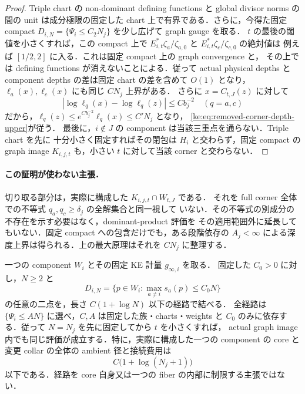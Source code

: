 \begin{proof}
Triple chart の non-dominant defining functions と global divisor norms の間の
unit は成分極限の固定した chart 上で有界である．さらに，今得た固定 compact
$D_{i,N}=\{\Psi_i\le C_2N_j\}$ を少し広げて graph gauge を取る．
$t$ の最後の閾値を小さくすれば，この compact 上で
$E_{i,t}^*\zeta_a/\zeta_{a,0}$ と $E_{i,t}^*\zeta_c/\zeta_{c,0}$ の絶対値は
例えば $[1/2,2]$ に入る．これは固定 compact 上の graph convergence と，
その上では defining functions が消えないことによる．従って actual physical depths と
component depths の差は固定 chart の差を含めて $O(1)$ となり，
$\ell_a(x),\ell_c(x)$ にも同じ $C N_j$ 上界がある．
さらに $x=C_{t,J}(z)$ に対して
\[
 |\log\ell_q(x)-\log\ell_q(z)|\le Cb_j^{-2}
 \quad(q=a,c)
\]
だから，$\ell_q(z)\le e^{Cb_j^{-2}}\ell_q(x)\le C'N_j$ となり，
\eqref{ke:eq:removed-corner-depth-upper}が従う．
最後に，$i\notin J$ の component は当該三重点を通らない．Triple chart を先に
十分小さく固定すればその閉包は $H_i$ と交わらず，固定 compact の graph image
$K_{i,j,t}$ も，小さい $t$ に対して当該 corner と交わらない．
\end{proof}

\paragraph{この証明が使わない主張．}
切り取る部分は，実際に構成した $K_{i,j,t}\cap W_{t,J}$ である．
それを full corner 全体での不等式 $q_a,q_c\ge\delta_j$ の全解集合と同一視して
いない．その不等式の別成分の不存在を示す必要はなく，dominant-product 評価を
その適用範囲外に延長してもいない．固定 compact への包含だけでも，ある段階依存の
$A_j<\infty$ による深度上界は得られる．上の最大原理はそれを $C N_j$ に整理する．

\begin{proposition}
\label{ke:component-logarithmic-connectors}
一つの component $W_i$ とその固定 KE 計量 $g_{\infty,i}$ を取る．
固定した $C_0>0$ に対し，$N\ge2$ と
\[
 D_{i,N}=\{p\in W_i:\max_{a\ne i}s_a(p)\le C_0N\}
\]
の任意の二点を，長さ $C(1+\log N)$ 以下の経路で結べる．
全経路は $\{\Psi_i\le AN\}$ に選べ，$C,A$ は固定した族・charts・weights と
$C_0$ のみに依存する．従って $N=N_j$ を先に固定してから $t$ を小さくすれば，
actual graph image 内でも同じ評価が成立する．特に，実際に構成した一つの
component の core と変更 collar の全体の ambient 径と接続費用は
\begin{equation}\label{ke:eq:component-logarithmic-budget}
 C\bigl(1+\log(N_j+1)\bigr)
\end{equation}
以下である．経路を core 自身又は一つの fiber の内部に制限する主張ではない．
\end{proposition}

